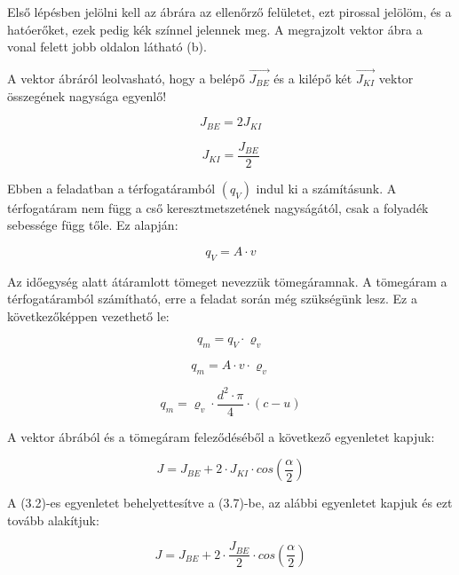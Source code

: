 \noindent\hrulefill

\noindent Első lépésben jelölni kell az ábrára az ellenőrző felületet, ezt pirossal jelölöm, és a hatóerőket, ezek pedig kék színnel jelennek meg. A megrajzolt vektor ábra a vonal felett jobb oldalon látható (b).

\noindent A vektor ábráról leolvasható, hogy a belépő $\vec{J_{BE}}$ és a kilépő két $\vec{J_{KI}}$ vektor összegének nagysága egyenlő!

\begin{equation}
J_{BE} = 2 J_{KI}
\end{equation}

\begin{equation}
J_{KI} = \frac{J_{BE}}{2}
\end{equation}

\noindent Ebben a feladatban a térfogatáramból $(q_V)$ indul ki a számításunk. A térfogatáram nem függ a cső keresztmetszetének nagyságától, csak a folyadék sebessége függ tőle. Ez alapján:

\begin{equation}
q_V=A\cdot{v}
\end{equation}

\noindent Az időegység alatt átáramlott tömeget nevezzük tömegáramnak. A tömegáram a térfogatáramból számítható, erre a feladat során még szükségünk lesz. Ez a következőképpen vezethető le:

\begin{equation}
q_m=q_V\cdot{\varrho_v}
\end{equation}

\begin{equation}
q_m=A\cdot{v}\cdot{\varrho_v}
\end{equation}

\begin{equation}
q_m={\varrho_v}\cdot{\frac{d^2\cdot{\pi}}{4}}\cdot(c-u)
\end{equation}


\noindent A vektor ábrából és a tömegáram feleződéséből a következő egyenletet kapjuk:

\begin{equation}
J=J_{BE}+2\cdot{J_{KI}\cdot{cos\left(\frac{\alpha}{2}\right)}}
\end{equation}

\noindent A (3.2)-es egyenletet behelyettesítve a (3.7)-be, az alábbi egyenletet kapjuk és ezt tovább alakítjuk:

\begin{equation}
J=J_{BE}+2\cdot\frac{J_{BE}}{2}\cdot{cos\left(\frac{\alpha}{2}\right)}
\end{equation}

